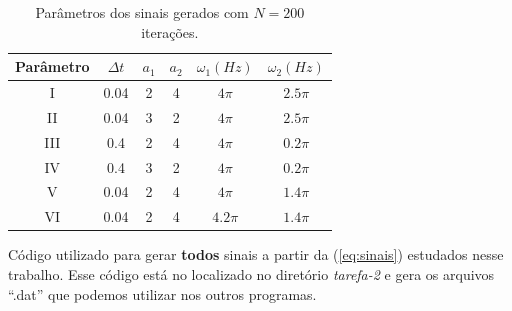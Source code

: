 \documentclass[a4paper, 11pt]{article}
\begin{document}
\begin{table}[h!]
  \centering
\begin{tabular}{|c|c|c|c|c|c|}
\hline
Parâmetro                       & $\Delta t$                & $a_1$                  & $a_2$ & $\omega_1 (Hz)$ & $\omega_2 (Hz)$ \\ \hline
I                       & 0.04                 & 2                      & 4     & $4\pi$     & $2.5\pi$   \\ \hline
II                       & 0.04                 & 3                      & 2     & $4\pi$     & $2.5\pi$   \\ \hline
III                       & 0.4                  & 2                      & 4     & $4\pi$     & $0.2\pi$   \\ \hline
IV                       & 0.4  & 3 & 2         & $4\pi$                   & $0.2\pi$   \\ \hline
V                       & 0.04 & 2 & 4         & $4\pi$                   & $1.4\pi$   \\ \hline
VI                       & 0.04 & 2 & 4         & $4.2\pi$                 & $1.4\pi$   \\ \hline
\end{tabular}
\caption{Parâmetros dos sinais gerados com $N = 200$ iterações.}
\label{tbl:parametros_sinais}
\end{table}

Código utilizado para gerar {\bfseries todos } sinais a partir da (\ref{eq:sinais}) estudados nesse trabalho.
Esse código está no localizado no diretório \emph{tarefa-2} e gera os arquivos ``.dat'' que podemos
utilizar nos outros programas.
\end{document}
